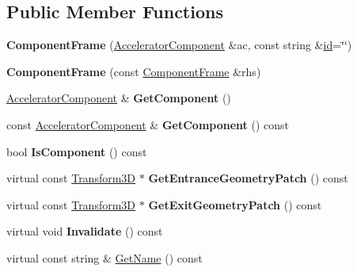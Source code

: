 \subsection*{Public Member Functions}
\begin{DoxyCompactItemize}
\item 
\mbox{\label{classComponentFrame_a72c737f7b560d3914d87f3716331bcc8}} 
{\bfseries Component\+Frame} (\hyperlink{classAcceleratorComponent}{Accelerator\+Component} \&ac, const string \&\hyperlink{classModelElement_aada171ead2085c75b592cf07d91bc5c2}{id}=\char`\"{}\char`\"{})
\item 
\mbox{\label{classComponentFrame_a375129b6b8d2fdc5597612ad1d50d3f8}} 
{\bfseries Component\+Frame} (const \hyperlink{classComponentFrame}{Component\+Frame} \&rhs)
\item 
\mbox{\label{classComponentFrame_a625e7460564cd2d4352c9d8c50b9d20c}} 
\hyperlink{classAcceleratorComponent}{Accelerator\+Component} \& {\bfseries Get\+Component} ()
\item 
\mbox{\label{classComponentFrame_a4fc89e92e4184017cd9e2847cc1aa670}} 
const \hyperlink{classAcceleratorComponent}{Accelerator\+Component} \& {\bfseries Get\+Component} () const
\item 
\mbox{\label{classComponentFrame_ac986b27ff10603bc444d24adf9083048}} 
bool {\bfseries Is\+Component} () const
\item 
\mbox{\label{classComponentFrame_aedbeb7e7ee6174ca0bb87e811507d010}} 
virtual const \hyperlink{classTransform3D}{Transform3D} $\ast$ {\bfseries Get\+Entrance\+Geometry\+Patch} () const
\item 
\mbox{\label{classComponentFrame_aebc675ac7af1342156b86e2a655212f3}} 
virtual const \hyperlink{classTransform3D}{Transform3D} $\ast$ {\bfseries Get\+Exit\+Geometry\+Patch} () const
\item 
\mbox{\label{classComponentFrame_ab9bb6673e9023fe21fe3e82eee581fce}} 
virtual void {\bfseries Invalidate} () const
\item 
virtual const string \& \hyperlink{classComponentFrame_a32bc80a48e64f286ee07519e17220248}{Get\+Name} () const

\end{DoxyCompactItemize}
